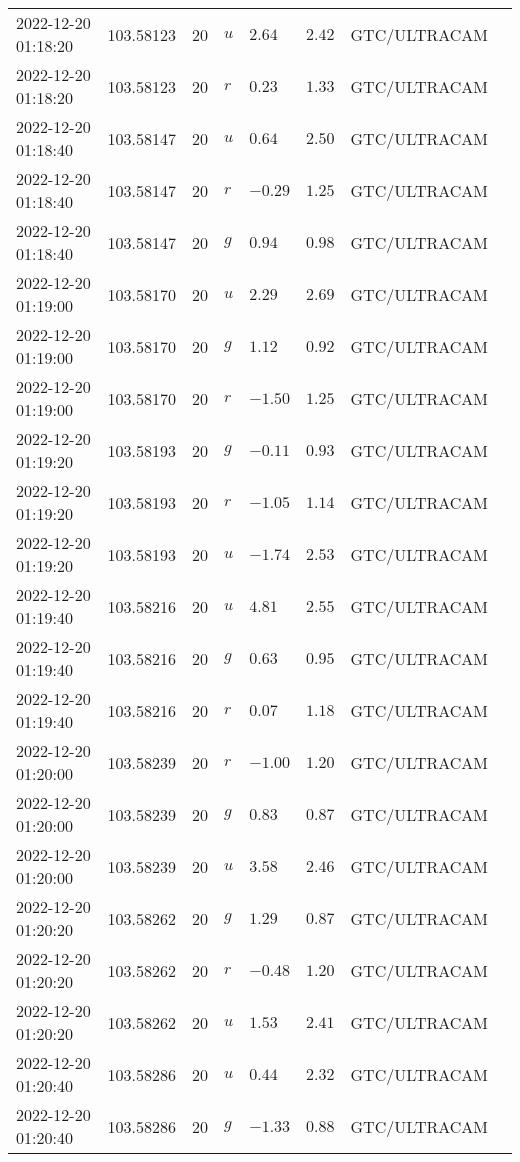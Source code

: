\documentclass{nature_plusfigure}
\begin{document}
\begin{supplement}
\begin{center}
\begin{longtable}{llllllll}
2022-12-20 01:18:20 & 103.58123 & 20 & $u$ & $2.64$ & $2.42$ & GTC/ULTRACAM &  \\ 
2022-12-20 01:18:20 & 103.58123 & 20 & $r$ & $0.23$ & $1.33$ & GTC/ULTRACAM &  \\ 
2022-12-20 01:18:40 & 103.58147 & 20 & $u$ & $0.64$ & $2.50$ & GTC/ULTRACAM &  \\ 
2022-12-20 01:18:40 & 103.58147 & 20 & $r$ & $-0.29$ & $1.25$ & GTC/ULTRACAM &  \\ 
2022-12-20 01:18:40 & 103.58147 & 20 & $g$ & $0.94$ & $0.98$ & GTC/ULTRACAM &  \\ 
2022-12-20 01:19:00 & 103.58170 & 20 & $u$ & $2.29$ & $2.69$ & GTC/ULTRACAM &  \\ 
2022-12-20 01:19:00 & 103.58170 & 20 & $g$ & $1.12$ & $0.92$ & GTC/ULTRACAM &  \\ 
2022-12-20 01:19:00 & 103.58170 & 20 & $r$ & $-1.50$ & $1.25$ & GTC/ULTRACAM &  \\ 
2022-12-20 01:19:20 & 103.58193 & 20 & $g$ & $-0.11$ & $0.93$ & GTC/ULTRACAM &  \\ 
2022-12-20 01:19:20 & 103.58193 & 20 & $r$ & $-1.05$ & $1.14$ & GTC/ULTRACAM &  \\ 
2022-12-20 01:19:20 & 103.58193 & 20 & $u$ & $-1.74$ & $2.53$ & GTC/ULTRACAM &  \\ 
2022-12-20 01:19:40 & 103.58216 & 20 & $u$ & $4.81$ & $2.55$ & GTC/ULTRACAM &  \\ 
2022-12-20 01:19:40 & 103.58216 & 20 & $g$ & $0.63$ & $0.95$ & GTC/ULTRACAM &  \\ 
2022-12-20 01:19:40 & 103.58216 & 20 & $r$ & $0.07$ & $1.18$ & GTC/ULTRACAM &  \\ 
2022-12-20 01:20:00 & 103.58239 & 20 & $r$ & $-1.00$ & $1.20$ & GTC/ULTRACAM &  \\ 
2022-12-20 01:20:00 & 103.58239 & 20 & $g$ & $0.83$ & $0.87$ & GTC/ULTRACAM &  \\ 
2022-12-20 01:20:00 & 103.58239 & 20 & $u$ & $3.58$ & $2.46$ & GTC/ULTRACAM &  \\ 
2022-12-20 01:20:20 & 103.58262 & 20 & $g$ & $1.29$ & $0.87$ & GTC/ULTRACAM &  \\ 
2022-12-20 01:20:20 & 103.58262 & 20 & $r$ & $-0.48$ & $1.20$ & GTC/ULTRACAM &  \\ 
2022-12-20 01:20:20 & 103.58262 & 20 & $u$ & $1.53$ & $2.41$ & GTC/ULTRACAM &  \\ 
2022-12-20 01:20:40 & 103.58286 & 20 & $u$ & $0.44$ & $2.32$ & GTC/ULTRACAM &  \\ 
2022-12-20 01:20:40 & 103.58286 & 20 & $g$ & $-1.33$ & $0.88$ & GTC/ULTRACAM &  \\ 

\end{longtable}
\end{center}
\end{supplement}
\end{document}
